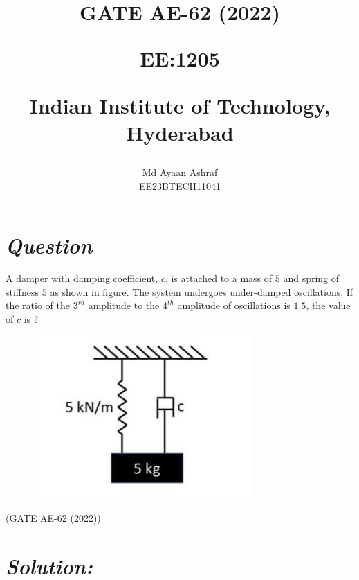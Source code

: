 \documentclass[journal,12pt,twocolumn]{IEEEtran}
\theoremstyle{remark}
\begin{document}
%




\vspace{3cm}

\title{
GATE AE-62 (2022)

\large{EE:1205 }

Indian Institute of Technology, Hyderabad
}
\author{Md Ayaan Ashraf

EE23BTECH11041
}  
\maketitle
\newpage
\bigskip
\renewcommand{\thefigure}{\arabic{figure}}
\renewcommand{\thetable}{\arabic{table}}
\section*{\textit{\textbf{Question}}}
A damper with damping coefficient, $c$, is attached to a mass of $5$  and spring of stiffness  $5$  as shown in figure. The system undergoes under-damped oscillations.
If the ratio of the $3^{rd}$ amplitude to the $4^{th}$ amplitude of oscillations is ${1.5}$, the value of $c$ is ?
\begin{figure}[ht]
    \centering
    \includegraphics[width=\columnwidth]{figs/fig1.png}
\end{figure}

\hfill {(GATE AE-62 (2022))}
\section*{\textit{\textbf{Solution:}}}

    \begin{figure}[h]
        \centering
        
        \label{fig:Fig-1}
    \end{figure}
\end{document}
